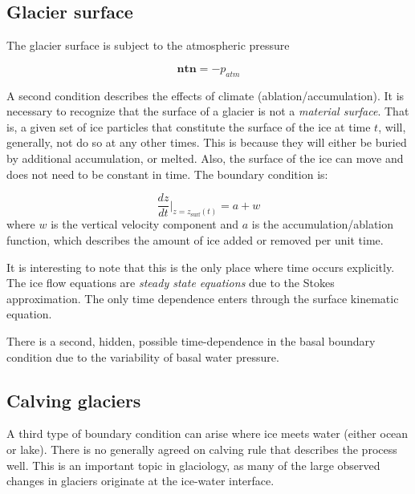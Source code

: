 \documentclass[12pt, openany]{memoir}
\begin{document}
\subsection{Glacier surface}

The glacier surface is subject to the atmospheric pressure

\begin{equation}
\mathbf{n} \mathbf{t} \mathbf{n} = -p_{atm}
\end{equation}

A second condition describes the effects of climate
(ablation/accumulation). It is necessary to recognize that the surface
of a glacier is not a \emph{material surface}. That is, a given set of
ice particles that constitute the surface of the ice at time $t$,
will, generally, not do so at any other times. This is because they
will either be buried by additional accumulation, or melted. Also, the
surface of the ice can move and does not need to be constant in
time. The boundary condition is:

\begin{equation}
\frac{dz}{dt}|_{z=z_\mathrm{surf}(t)} = a + w
\end{equation}
where $w$ is the vertical velocity component and $a$ is the
accumulation/ablation function, which describes the amount of ice
added or removed per unit time.

It is interesting to note that this is the only place where time
occurs explicitly. The ice flow equations are \emph{steady state
  equations} due to the Stokes approximation. The only time dependence
enters through the surface kinematic equation.

There is a second, hidden, possible time-dependence in the basal
boundary condition due to the variability of basal water pressure.

\subsection{Calving glaciers}

A third type of boundary condition can arise where ice meets water
(either ocean or lake). There is no generally agreed on calving rule
that describes the process well. This is an important topic in
glaciology, as many of the large observed changes in glaciers
originate at the ice-water interface.
\end{document}
